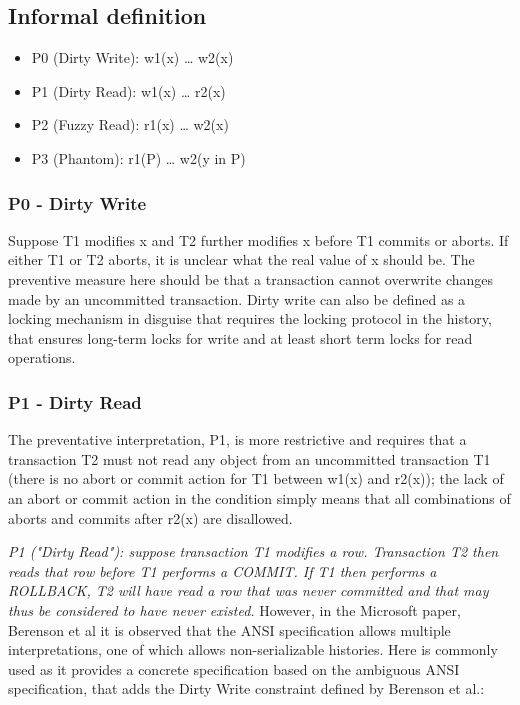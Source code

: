 \documentclass[a4paper,10pt,titlepage]{report}
\begin{document}
\subsection{Informal definition}

\begin{itemize}
    \item P0 (Dirty Write): w1(x) … w2(x)
    \item P1 (Dirty Read): w1(x) … r2(x)
    \item P2 (Fuzzy Read): r1(x) … w2(x)
    \item P3 (Phantom): r1(P) … w2(y in P)
\end{itemize}

    \subsubsection{P0 - Dirty Write}
        Suppose T1 modifies x and T2 further modifies x before T1 commits or aborts. If either T1 or T2 aborts, it is unclear what the real value of x should be. The preventive measure here should be that a transaction cannot overwrite changes made by an uncommitted transaction. Dirty write can also be defined as a locking mechanism in disguise that requires the locking protocol in the history, that ensures long-term locks for write and at least short term locks for read operations.


    \subsubsection{P1 - Dirty Read}
        The preventative interpretation, P1, is more restrictive and requires that a transaction T2 must not read any object from an uncommitted transaction T1 (there is no abort or commit action for T1 between w1(x) and r2(x)); the lack of an abort or commit action in the condition simply means that all combinations of aborts and commits after r2(x) are disallowed.


    \textit{P1 ("Dirty Read"): suppose transaction T1 modifies a row. Transaction T2 then reads that row before T1 performs a COMMIT. If T1 then performs a ROLLBACK, T2 will have read a row that was never committed and that may thus be considered to have never existed.} However, in the Microsoft paper, Berenson et al\cite{Berensonetal} it is observed that the ANSI specification allows multiple interpretations, one of which allows non-serializable histories. Here \cite{Adya99weakconsistency} is commonly used as it provides a concrete specification based on the ambiguous ANSI specification, that adds the Dirty Write constraint defined by Berenson et al\cite{Berensonetal}.:
    
\end{document}
